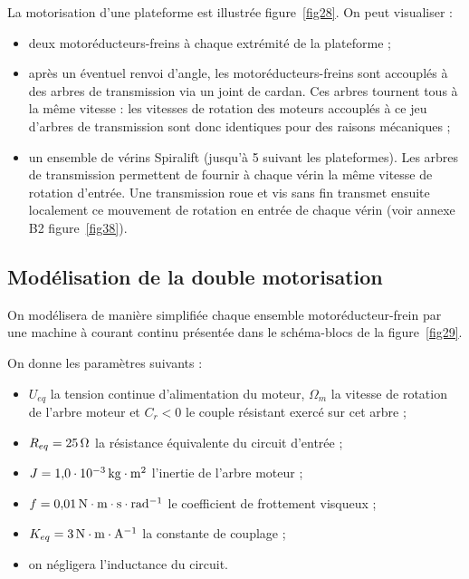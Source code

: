 La motorisation d'une plateforme est illustrée figure~\ref{fig28}. On peut visualiser :
\begin{itemize}
\item[---] deux motoréducteurs-freins à chaque extrémité de la plateforme ;
\item[---] après un éventuel renvoi d'angle, les motoréducteurs-freins sont accouplés à des arbres de transmission via un joint de cardan. Ces arbres tournent tous à la même vitesse : les vitesses de rotation des moteurs accouplés à ce jeu d'arbres de transmission sont donc identiques pour des raisons mécaniques ;
\item[---] un ensemble de vérins Spiralift (jusqu'à 5 suivant les plateformes). Les arbres de transmission permettent de fournir à chaque vérin la même vitesse de rotation d'entrée. Une transmission roue et vis sans fin transmet ensuite localement ce mouvement de rotation en entrée de chaque vérin (voir annexe B2 figure~\ref{fig38}).
\end{itemize}


\newpage

\subsection{Modélisation de la double motorisation}

On modélisera de manière simplifiée chaque ensemble motoréducteur-frein par une machine à courant continu présentée dans le schéma-blocs de la figure~\ref{fig29}.


On donne les paramètres suivants :
\begin{itemize}
\item[---] $U_{eq}$ la tension continue d'alimentation du moteur, $\Omega_m$ la vitesse de rotation de l'arbre moteur et $C_r<0$ le couple résistant exercé sur cet arbre ;
\item[---] $R_{eq}=25\,\mathrm{\Omega}$ la résistance équivalente du circuit d'entrée ;
\item[---] $J=1{,}0\cdot10^{-3}\,\mathrm{kg\cdot m^2}$ l'inertie de l'arbre moteur ;
\item[---] $f=0{,}01\,\mathrm{N\cdot m\cdot s\cdot rad^{-1}}$ le coefficient de frottement visqueux ;
\item[---] $K_{eq}=3\,\mathrm{N\cdot m\cdot A^{-1}}$ la constante de couplage ;
\item[---] on négligera l'inductance du circuit.
\end{itemize}

